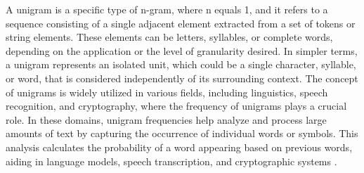A unigram is a specific type of n-gram, where n equals 1, and it refers to a sequence consisting of a single adjacent element extracted from a set of tokens or string elements. These elements can be letters, syllables, or complete words, depending on the application or the level of granularity desired. In simpler terms, a unigram represents an isolated unit, which could be a single character, syllable, or word, that is considered independently of its surrounding context. The concept of unigrams is widely utilized in various fields, including linguistics, speech recognition, and cryptography, where the frequency of unigrams plays a crucial role. In these domains, unigram frequencies help analyze and process large amounts of text by capturing the occurrence of individual words or symbols. This analysis calculates the probability of a word appearing based on previous words, aiding in language models, speech transcription, and cryptographic systems \cite{Jimoh2021}.